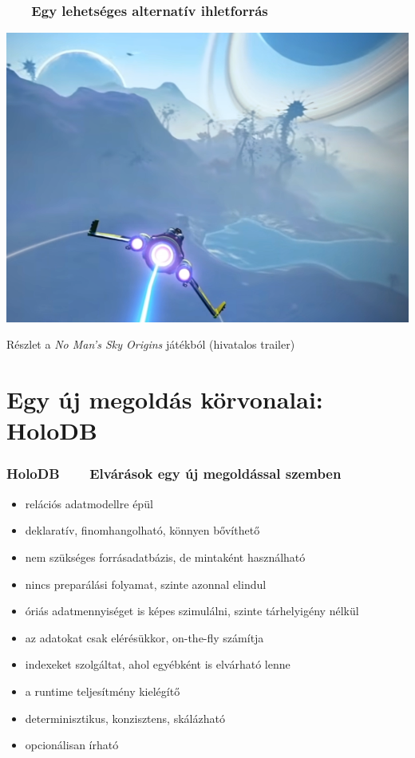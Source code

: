 \documentclass[
]{beamer}
\newcommand{\slidetitle}[2]{\frametitle{{\small #1 ~ \ding{226} ~ } \normalsize \textbf{#2} }}
\begin{document}
\begin{frame}
    \slidetitle{\sectionshorttitle}{Egy lehetséges alternatív ihletforrás}
    
    \centering
    
    \includegraphics[height=0.55\textwidth]{image/nomanssky}
    
    \smallskip
    
    Részlet a \textit{No Man's Sky Origins} játékból (hivatalos trailer)
\end{frame}

\section{Egy új megoldás körvonalai: HoloDB}
\def\sectionshorttitle{HoloDB}

\begin{frame}
    \slidetitle{\sectionshorttitle}{Elvárások egy új megoldással szemben}
    
    \begin{itemize}
        \setlength\itemsep{0.5em}
        \item {\color{red}relációs} adatmodellre épül
        \item {\color{red}deklaratív}, finomhangolható, könnyen bővíthető
        \item nem szükséges forrásadatbázis, de mintaként használható
        \item {\color{red}nincs preparálás}i folyamat, szinte azonnal elindul
        \item óriás adatmennyiséget is képes szimulálni, szinte { \color{red} tárhelyigény nélkül }
        \item az adatokat csak elérésükkor, on-the-fly számítja
        \item indexeket szolgáltat, ahol egyébként is elvárható lenne
        \item a runtime teljesítmény kielégítő
        \item determinisztikus, {\color{red}konzisztens}, skálázható
        \item opcionálisan írható
    \end{itemize}
\end{frame}
\end{document}

